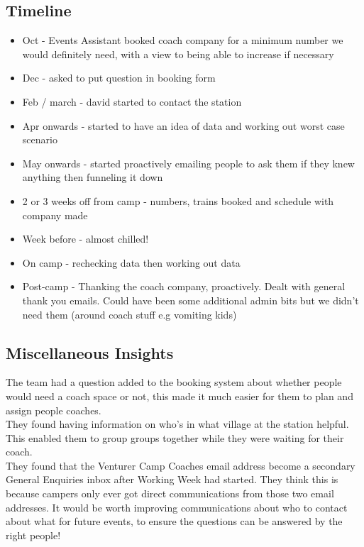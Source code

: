 \subsection{Timeline}
\begin{itemize}
    \item Oct - Events Assistant booked coach company for a minimum number we would definitely need, with a view to being able to increase if necessary
    \item Dec - asked to put question in booking form
    \item Feb / march - david started to contact the station
    \item Apr onwards - started to have an idea of data and working out worst case scenario
    \item May onwards - started proactively emailing people to ask them if they knew anything then funneling it down
    \item 2 or 3 weeks off from camp - numbers, trains booked and schedule with company made
    \item Week before - almost chilled!
    \item On camp - rechecking data then working out data
    \item Post-camp -  Thanking the coach company, proactively. Dealt with general thank you emails. Could have been some additional admin bits but we didn't need them (around coach stuff e.g vomiting kids)
\end{itemize}

\subsection{Miscellaneous Insights}
The team had a question added to the booking system about whether people would need a coach space or not, this made it much easier for them to plan and assign people coaches.\\

They found having information on who's in what village at the station helpful. This enabled them to group groups together while they were waiting for their coach. \\

They found that the Venturer Camp Coaches email address become a secondary General Enquiries inbox after Working Week had started. They think this is because campers only ever got direct communications from those two email addresses. It would be worth improving communications about who to contact about what for future events, to ensure the questions can be answered by the right people!\\

